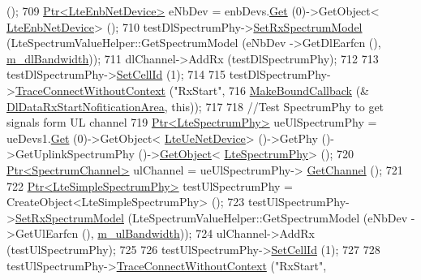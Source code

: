 \begin{DoxyCode}
       ();
709   \hyperlink{classns3_1_1Ptr}{Ptr<LteEnbNetDevice>} eNbDev = enbDevs.\hyperlink{classns3_1_1NetDeviceContainer_a677d62594b5c9d2dea155cc5045f4d0b}{Get} (0)->GetObject<
      \hyperlink{classns3_1_1LteEnbNetDevice}{LteEnbNetDevice}> ();
710   testDlSpectrumPhy->\hyperlink{classns3_1_1LteSimpleSpectrumPhy_a1cbc14b5951a6c9360d3b180760429d9}{SetRxSpectrumModel} (LteSpectrumValueHelper::GetSpectrumModel (eNbDev
      ->GetDlEarfcn (), \hyperlink{classLteFrAreaTestCase_a645fc2cea287afbd373f6d702152cf47}{m\_dlBandwidth}));
711   dlChannel->AddRx (testDlSpectrumPhy);
712 
713   testDlSpectrumPhy->\hyperlink{classns3_1_1LteSimpleSpectrumPhy_aed3e4883b1f03358a744746b08fbd5d8}{SetCellId} (1);
714 
715   testDlSpectrumPhy->\hyperlink{classns3_1_1ObjectBase_a1be45f6fd561e75dcac9dfa81b2b81e4}{TraceConnectWithoutContext} (\textcolor{stringliteral}{"RxStart"},
716                                                  \hyperlink{group__makeboundcallback_ga1725d6362e6065faa0709f7c93f8d770}{MakeBoundCallback} (&
      \hyperlink{lte-test-frequency-reuse_8cc_a39fd51e5983e3a2105d2862729ad91e0}{DlDataRxStartNofiticationArea}, \textcolor{keyword}{this}));
717 
718   \textcolor{comment}{//Test SpectrumPhy to get signals form UL channel}
719   \hyperlink{classns3_1_1Ptr}{Ptr<LteSpectrumPhy>} ueUlSpectrumPhy = ueDevs1.\hyperlink{classns3_1_1NetDeviceContainer_a677d62594b5c9d2dea155cc5045f4d0b}{Get} (0)->GetObject<
      \hyperlink{classns3_1_1LteUeNetDevice}{LteUeNetDevice}> ()->GetPhy ()->GetUplinkSpectrumPhy ()->\hyperlink{classns3_1_1Object_a13e18c00017096c8381eb651d5bd0783}{GetObject}<
      \hyperlink{classns3_1_1LteSpectrumPhy}{LteSpectrumPhy}> ();
720   \hyperlink{classns3_1_1Ptr}{Ptr<SpectrumChannel>} ulChannel = ueUlSpectrumPhy->
      \hyperlink{classns3_1_1LteSpectrumPhy_a50f13e43568687ee32c5d63e5bf639c2}{GetChannel} ();
721 
722   \hyperlink{classns3_1_1Ptr}{Ptr<LteSimpleSpectrumPhy>} testUlSpectrumPhy = CreateObject<LteSimpleSpectrumPhy>
       ();
723   testUlSpectrumPhy->\hyperlink{classns3_1_1LteSimpleSpectrumPhy_a1cbc14b5951a6c9360d3b180760429d9}{SetRxSpectrumModel} (LteSpectrumValueHelper::GetSpectrumModel (eNbDev
      ->GetUlEarfcn (), \hyperlink{classLteFrAreaTestCase_afa54487d9f12658bbead39e1272f4d8c}{m\_ulBandwidth}));
724   ulChannel->AddRx (testUlSpectrumPhy);
725 
726   testUlSpectrumPhy->\hyperlink{classns3_1_1LteSimpleSpectrumPhy_aed3e4883b1f03358a744746b08fbd5d8}{SetCellId} (1);
727 
728   testUlSpectrumPhy->\hyperlink{classns3_1_1ObjectBase_a1be45f6fd561e75dcac9dfa81b2b81e4}{TraceConnectWithoutContext} (\textcolor{stringliteral}{"RxStart"},

\end{DoxyCode}
